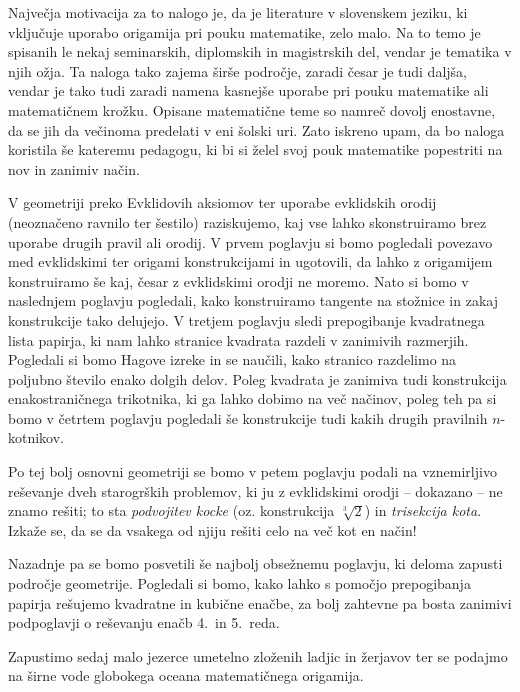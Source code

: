 Največja motivacija za to nalogo je, da je literature v slovenskem jeziku, ki vključuje uporabo origamija pri pouku matematike, zelo malo. Na to temo je spisanih le nekaj seminarskih, diplomskih in magistrskih del, vendar je tematika v njih ožja. Ta naloga tako zajema širše področje, zaradi česar je tudi daljša, vendar je tako tudi zaradi namena kasnejše uporabe pri pouku matematike ali matematičnem krožku. Opisane matematične teme so namreč dovolj enostavne, da se jih da večinoma predelati v eni šolski uri. Zato iskreno upam, da bo naloga koristila še kateremu pedagogu, ki bi si želel svoj pouk matematike popestriti na nov in zanimiv način.

V geometriji preko Evklidovih aksiomov ter uporabe evklidskih orodij (neoznačeno ravnilo ter šestilo) raziskujemo, kaj vse lahko skonstruiramo brez uporabe drugih pravil ali orodij. V prvem poglavju si bomo pogledali povezavo med evklidskimi ter origami konstrukcijami in ugotovili, da lahko z origamijem konstruiramo še kaj, česar z evklidskimi orodji ne moremo. Nato si bomo v naslednjem poglavju pogledali, kako konstruiramo tangente na stožnice in zakaj konstrukcije tako delujejo. V tretjem poglavju sledi prepogibanje kvadratnega lista papirja, ki nam lahko stranice kvadrata razdeli v zanimivih razmerjih. Pogledali si bomo Hagove izreke in se naučili, kako stranico razdelimo na poljubno število enako dolgih delov. Poleg kvadrata je zanimiva tudi konstrukcija enakostraničnega trikotnika, ki ga lahko dobimo na več načinov, poleg teh pa si bomo v četrtem poglavju pogledali še konstrukcije tudi kakih drugih pravilnih $n$-kotnikov.

Po tej bolj osnovni geometriji se bomo v petem poglavju podali na vznemirljivo reševanje dveh starogrških problemov, ki ju z evklidskimi orodji -- dokazano -- ne znamo rešiti; to sta \emph{podvojitev kocke} (oz. konstrukcija $\sqrt[3]{2}$) in \emph{trisekcija kota}. Izkaže se, da se da vsakega od njiju rešiti celo na več kot en način!

Nazadnje pa se bomo posvetili še najbolj obsežnemu poglavju, ki deloma zapusti področje geometrije. Pogledali si bomo, kako lahko s pomočjo prepogibanja papirja rešujemo kvadratne in kubične enačbe, za bolj zahtevne pa bosta zanimivi podpoglavji o reševanju enačb 4.\ in 5.\ reda.

Zapustimo sedaj malo jezerce umetelno zloženih ladjic in žerjavov ter se podajmo na širne vode globokega oceana matematičnega origamija.